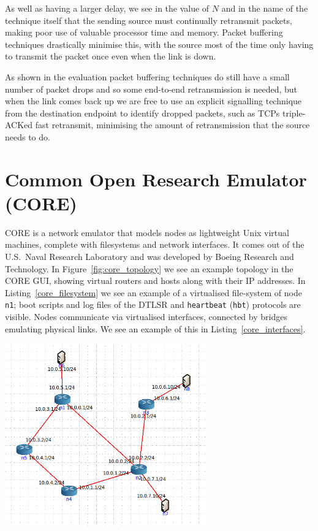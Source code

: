 \documentclass[withindex,glossary,openany]{cam-thesis}
\begin{document}
As well as having a larger delay, we see in the value of $N$ and in the name of the technique itself that the sending source must continually retransmit packets, making poor use of valuable processor time and memory. Packet buffering techniques drastically minimise this, with the source most of the time only having to transmit the packet once even when the link is down.

As shown in the evaluation packet buffering techniques do still have a small number of packet drops and so some end-to-end retransmission is needed, but when the link comes back up we are free to use an explicit signalling technique from the destination endpoint to identify dropped packets, such as TCPs triple-ACKed fast retransmit, minimising the amount of retransmission that the source needs to do.

\section{Common Open Research Emulator (CORE)}
\label{sec:core}

CORE \cite{CORE} is a network emulator that models nodes as lightweight Unix virtual machines, complete with filesystems and network interfaces. It comes out of the U.S.\ Naval Research Laboratory and was developed by Boeing Research and Technology. In Figure~\ref{fig:core_topology} we see an example topology in the CORE GUI, showing virtual routers and hosts along with their IP addresses. In Listing~\ref{core_filesystem} we see an example of a virtualised file-system of node \texttt{n1}; boot scripts and log files of the DTLSR and \texttt{heartbeat} (\texttt{hbt}) protocols are visible. Nodes communicate via virtualised interfaces, connected by bridges emulating physical links. We see an example of this in Listing~\ref{core_interfaces}.

\begin{center}
\begin{minipage}{0.9\textwidth} \centering
	\includegraphics[width=0.65\textwidth]{core_topology}
	\label{fig:core_topology}
\end{minipage}
\end{center}
\end{document}
